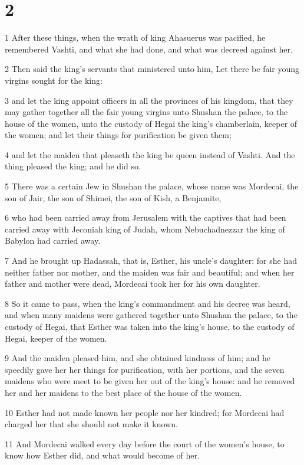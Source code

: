 \chapter{2}

\par 1 After these things, when the wrath of king Ahasuerus was pacified, he remembered Vashti, and what she had done, and what was decreed against her.
\par 2 Then said the king's servants that ministered unto him, Let there be fair young virgins sought for the king:
\par 3 and let the king appoint officers in all the provinces of his kingdom, that they may gather together all the fair young virgins unto Shushan the palace, to the house of the women, unto the custody of Hegai the king's chamberlain, keeper of the women; and let their things for purification be given them;
\par 4 and let the maiden that pleaseth the king be queen instead of Vashti. And the thing pleased the king; and he did so.
\par 5 There was a certain Jew in Shushan the palace, whose name was Mordecai, the son of Jair, the son of Shimei, the son of Kish, a Benjamite,
\par 6 who had been carried away from Jerusalem with the captives that had been carried away with Jeconiah king of Judah, whom Nebuchadnezzar the king of Babylon had carried away.
\par 7 And he brought up Hadassah, that is, Esther, his uncle's daughter: for she had neither father nor mother, and the maiden was fair and beautiful; and when her father and mother were dead, Mordecai took her for his own daughter.
\par 8 So it came to pass, when the king's commandment and his decree was heard, and when many maidens were gathered together unto Shushan the palace, to the custody of Hegai, that Esther was taken into the king's house, to the custody of Hegai, keeper of the women.
\par 9 And the maiden pleased him, and she obtained kindness of him; and he speedily gave her her things for purification, with her portions, and the seven maidens who were meet to be given her out of the king's house: and he removed her and her maidens to the best place of the house of the women.
\par 10 Esther had not made known her people nor her kindred; for Mordecai had charged her that she should not make it known.
\par 11 And Mordecai walked every day before the court of the women's house, to know how Esther did, and what would become of her.

